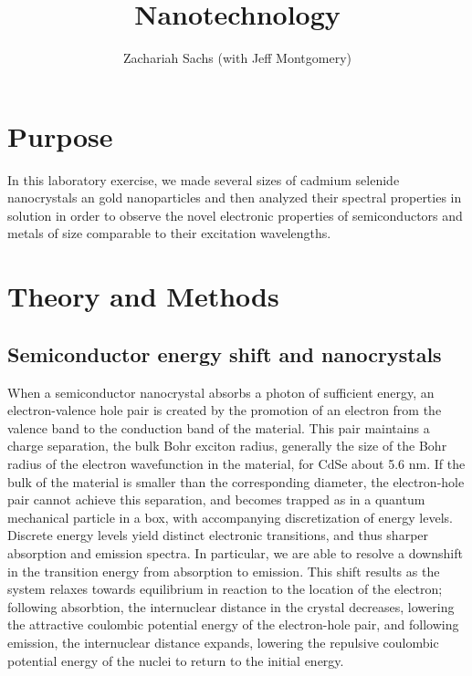 \documentclass{article}
\title{Nanotechnology}
\author{Zachariah Sachs (with Jeff Montgomery)}
\begin{document}
\maketitle
\section{Purpose}

In this laboratory exercise, we made several sizes of cadmium selenide nanocrystals an gold 
nanoparticles and then analyzed their spectral properties in solution
in order to observe the novel electronic properties of semiconductors and metals of size
comparable to their excitation wavelengths.

\section{Theory and Methods}

\subsection{Semiconductor energy shift and nanocrystals}

When a semiconductor nanocrystal absorbs a photon of sufficient energy, an 
electron-valence hole
pair is created by the promotion of an electron from the valence band to the conduction band
of the material. This pair maintains a charge separation, the bulk Bohr exciton radius, 
generally the size of the Bohr radius of the electron wavefunction in the material, for CdSe
about 5.6 nm. If the bulk of the material is smaller than the corresponding diameter, the 
electron-hole pair cannot achieve this separation, and becomes trapped as in a quantum 
mechanical particle in a box, with accompanying discretization of energy levels.
Discrete energy levels yield distinct electronic transitions, and thus sharper absorption and
emission spectra. In particular, we are able to resolve a downshift in the transition energy
from absorption to emission. This shift results as the system relaxes towards equilibrium in
reaction to the location of the electron; following absorbtion, the internuclear distance in
the crystal decreases, lowering the attractive coulombic potential energy of the electron-hole 
pair, and following emission, the internuclear distance expands, lowering the repulsive
coulombic potential energy of the nuclei to return to the initial energy.
\end{document}
